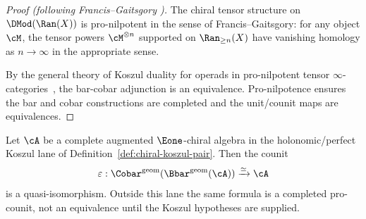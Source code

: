 \begin{proof}[Proof (following Francis--Gaitsgory \cite{FG12})]
The chiral tensor structure on $\DMod(\Ran(X))$ is pro-nilpotent in the sense
of Francis--Gaitsgory: for any object $\cM$, the tensor powers $\cM^{\otimes n}$
supported on $\Ran_{\geq n}(X)$ have vanishing homology as $n \to \infty$
in the appropriate sense.

By the general theory of Koszul duality for operads in pro-nilpotent tensor
$\infty$-categories~\cite{FG12}, the bar-cobar adjunction is an equivalence.
Pro-nilpotence ensures the bar and cobar constructions
are completed and the unit/counit maps are equivalences.
\end{proof}

\begin{theorem}
\label{thm:concrete-bar-cobar}
Let $\cA$ be a complete augmented $\Eone$-chiral algebra in the
holonomic/perfect Koszul lane of
Definition~\ref{def:chiral-koszul-pair}. Then the counit
\[
\varepsilon: \Cobar^{\mathrm{geom}}(\Bbar^{\mathrm{geom}}(\cA)) \xrightarrow{\simeq} \cA
\]
is a quasi-isomorphism. Outside this lane the same formula is a
completed pro-counit, not an equivalence until the Koszul hypotheses
are supplied.
\end{theorem}

